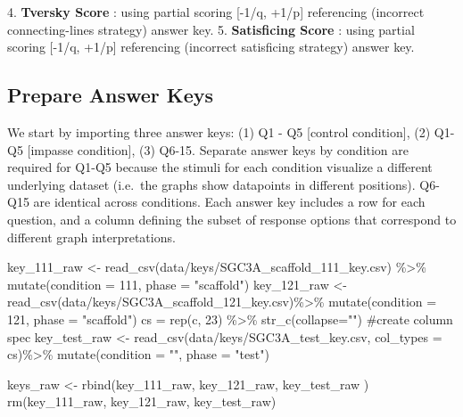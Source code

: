 \documentclass[
  letterpaper,
  DIV=11,
  numbers=noendperiod]{scrreprt}
\newenvironment{Shaded}{\begin{snugshade}}{\end{snugshade}}
\newcommand{\AttributeTok}[1]{\textcolor[rgb]{0.40,0.45,0.13}{#1}}
\newcommand{\CommentTok}[1]{\textcolor[rgb]{0.37,0.37,0.37}{#1}}
\newcommand{\DecValTok}[1]{\textcolor[rgb]{0.68,0.00,0.00}{#1}}
\newcommand{\FunctionTok}[1]{\textcolor[rgb]{0.28,0.35,0.67}{#1}}
\newcommand{\NormalTok}[1]{\textcolor[rgb]{0.00,0.23,0.31}{#1}}
\newcommand{\OtherTok}[1]{\textcolor[rgb]{0.00,0.23,0.31}{#1}}
\newcommand{\SpecialCharTok}[1]{\textcolor[rgb]{0.37,0.37,0.37}{#1}}
\newcommand{\StringTok}[1]{\textcolor[rgb]{0.13,0.47,0.30}{#1}}
\begin{document}
4. \textbf{Tversky Score} : using partial scoring {[}-1/q, +1/p{]}
referencing (incorrect connecting-lines strategy) answer key. 5.
\textbf{Satisficing Score} : using partial scoring {[}-1/q, +1/p{]}
referencing (incorrect satisficing strategy) answer key.

\hypertarget{prepare-answer-keys}{%
\subsection{Prepare Answer Keys}\label{prepare-answer-keys}}

We start by importing three answer keys: (1) Q1 - Q5 {[}control
condition{]}, (2) Q1-Q5 {[}impasse condition{]}, (3) Q6-15. Separate
answer keys by condition are required for Q1-Q5 because the stimuli for
each condition visualize a different underlying dataset (i.e.~the graphs
show datapoints in different positions). Q6-Q15 are identical across
conditions. Each answer key includes a row for each question, and a
column defining the subset of response options that correspond to
different graph interpretations.

\begin{Shaded}
\begin{Highlighting}[]
\NormalTok{key\_111\_raw }\OtherTok{\textless{}{-}} \FunctionTok{read\_csv}\NormalTok{(}\StringTok{\textquotesingle{}data/keys/SGC3A\_scaffold\_111\_key.csv\textquotesingle{}}\NormalTok{) }\SpecialCharTok{\%\textgreater{}\%} \FunctionTok{mutate}\NormalTok{(}\AttributeTok{condition =} \DecValTok{111}\NormalTok{, }\AttributeTok{phase =} \StringTok{"scaffold"}\NormalTok{)}
\NormalTok{key\_121\_raw }\OtherTok{\textless{}{-}} \FunctionTok{read\_csv}\NormalTok{(}\StringTok{\textquotesingle{}data/keys/SGC3A\_scaffold\_121\_key.csv\textquotesingle{}}\NormalTok{)}\SpecialCharTok{\%\textgreater{}\%} \FunctionTok{mutate}\NormalTok{(}\AttributeTok{condition =} \DecValTok{121}\NormalTok{, }\AttributeTok{phase =} \StringTok{"scaffold"}\NormalTok{)}
\NormalTok{cs }\OtherTok{=} \FunctionTok{rep}\NormalTok{(}\StringTok{\textquotesingle{}c\textquotesingle{}}\NormalTok{, }\DecValTok{23}\NormalTok{) }\SpecialCharTok{\%\textgreater{}\%} \FunctionTok{str\_c}\NormalTok{(}\AttributeTok{collapse=}\StringTok{""}\NormalTok{) }\CommentTok{\#create column spec }
\NormalTok{key\_test\_raw }\OtherTok{\textless{}{-}} \FunctionTok{read\_csv}\NormalTok{(}\StringTok{\textquotesingle{}data/keys/SGC3A\_test\_key.csv\textquotesingle{}}\NormalTok{, }\AttributeTok{col\_types =}\NormalTok{ cs)}\SpecialCharTok{\%\textgreater{}\%} \FunctionTok{mutate}\NormalTok{(}\AttributeTok{condition =} \StringTok{""}\NormalTok{, }\AttributeTok{phase =} \StringTok{"test"}\NormalTok{) }

\NormalTok{keys\_raw }\OtherTok{\textless{}{-}} \FunctionTok{rbind}\NormalTok{(key\_111\_raw, key\_121\_raw, key\_test\_raw )}
\FunctionTok{rm}\NormalTok{(key\_111\_raw, key\_121\_raw, key\_test\_raw)}
\end{Highlighting}
\end{Shaded}
\end{document}
